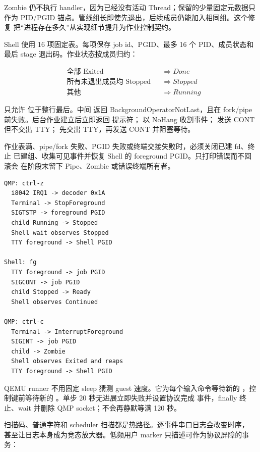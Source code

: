 Zombie 仍不执行 handler，因为已经没有活动 Thread；保留的少量固定元数据只
作为 PID/PGID 锚点。管线组长即使先退出，后续成员仍能加入相同组。这个修复
把“进程存在多久”从实现细节提升为作业控制契约。

Shell 使用 16 项固定表。每项保存 job id、PGID、最多 16 个 PID、成员状态和
最后 stage 退出码。作业状态按成员归约：

\[
\begin{aligned}
  &\text{全部 Exited} &&\Rightarrow Done\\
  &\text{所有未退出成员均 Stopped} &&\Rightarrow Stopped\\
  &\text{其他} &&\Rightarrow Running
\end{aligned}
\]

 只允许 \code{\&} 位于整行最后。中间 \code{\&} 返回
BackgroundOperatorNotLast，且在 fork/pipe 前失败。后台作业建立后立即返回
提示符； 以 NoHang 收割事件； 发送 CONT 但不交出 TTY；
 先交出 TTY，再发送 CONT 并阻塞等待。

\begin{failurebox}
作业表满、pipe/fork 失败、PGID 失败或终端交接失败时，必须关闭已建 fd、终止
已建组、收集可见事件并恢复 Shell 的 foreground PGID。只打印错误而不回滚会
在阶段末留下 Pipe、Zombie 或错误终端所有者。
\end{failurebox}

\par
\begin{lstlisting}
QMP: ctrl-z
  i8042 IRQ1 -> decoder 0x1A
  Terminal -> StopForeground
  SIGTSTP -> foreground PGID
  child Running -> Stopped
  Shell wait observes Stopped
  TTY foreground -> Shell PGID

Shell: fg
  TTY foreground -> job PGID
  SIGCONT -> job PGID
  child Stopped -> Ready
  Shell observes Continued

QMP: ctrl-c
  Terminal -> InterruptForeground
  SIGINT -> job PGID
  child -> Zombie
  Shell observes Exited and reaps
  TTY foreground -> Shell PGID
\end{lstlisting}

QEMU runner 不用固定 sleep 猜测 guest 速度。它为每个输入命令等待新的
，控制键前等待新的
。单步 20 秒无进展立即失败并设置协议完成
事件，finally 终止、wait 并删除 QMP socket；不会再静默等满 120 秒。

扫描码、普通字符和 scheduler 扫描都是热路径。逐事件串口日志会改变时序，
甚至让日志本身成为竞态放大器。低频用户 marker 只描述可作为协议屏障的事务：

